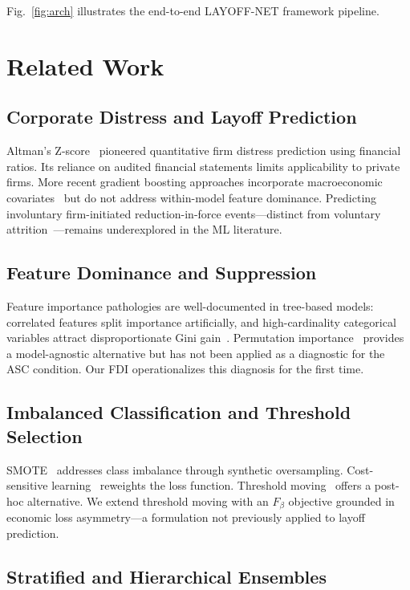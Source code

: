 \documentclass[conference]{IEEEtran}
\begin{document}
Fig.~\ref{fig:arch} illustrates the end-to-end LAYOFF-NET framework pipeline.

\section{Related Work}
\label{sec:related}

\subsection{Corporate Distress and Layoff Prediction}

Altman's Z-score~\cite{b2} pioneered quantitative firm distress prediction using financial ratios. Its reliance on audited financial statements limits applicability to private firms. More recent gradient boosting approaches incorporate macroeconomic covariates~\cite{b3} but do not address within-model feature dominance. Predicting involuntary firm-initiated reduction-in-force events---distinct from voluntary attrition~\cite{b4,b5}---remains underexplored in the ML literature.

\subsection{Feature Dominance and Suppression}

Feature importance pathologies are well-documented in tree-based models: correlated features split importance artificially, and high-cardinality categorical variables attract disproportionate Gini gain~\cite{b6}. Permutation importance~\cite{b7} provides a model-agnostic alternative but has not been applied as a diagnostic for the ASC condition. Our FDI operationalizes this diagnosis for the first time.

\subsection{Imbalanced Classification and Threshold Selection}

SMOTE~\cite{b8} addresses class imbalance through synthetic oversampling. Cost-sensitive learning~\cite{b9} reweights the loss function. Threshold moving~\cite{b10} offers a post-hoc alternative. We extend threshold moving with an $F_\beta$ objective grounded in economic loss asymmetry---a formulation not previously applied to layoff prediction.

\subsection{Stratified and Hierarchical Ensembles}
\end{document}
